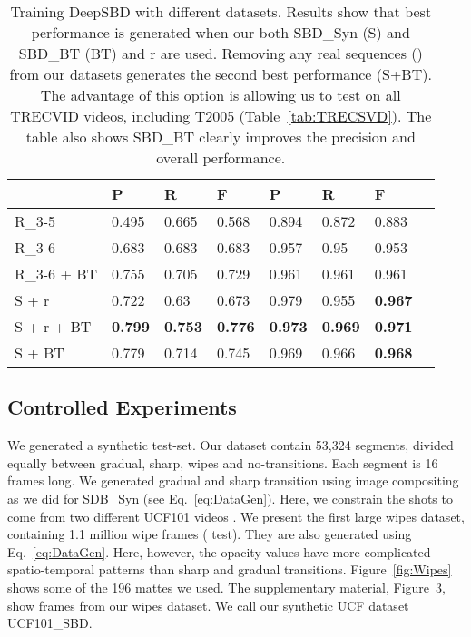 \documentclass[journal]{IEEEtran}
\begin{document}
\begin{table}
\small
\centering
\begin{tabular}{| l | l | l | l | l | l | l| l| }
     \hline              
												    &   P   & R  &  F & P    & R      & F       \\
     \hline


\hline
	      R\_3-5   		   & 0.495  & 0.665	& 0.568	& 0.894 	& 0.872	& 	0.883 \\
				\hline
				R\_3-6         & 0.683	& 0.683	& 0.683	& 0.957	& 0.95	& 0.953	 \\
				 \hline
				R\_3-6 + BT   & 0.755 & 0.705 & 0.729 & 0.961 & 0.961 & 0.961 \\
				\hline
				S + r         & 0.722 & 0.63 & 0.673 & 0.979 & 0.955 & \textbf{0.967} \\
        \hline
				S + r + BT    & \textbf{0.799} & \textbf{0.753} & \textbf{0.776} & \textbf{0.973} & \textbf{0.969} & \textbf{0.971}\\				
        \hline
			  S + BT     & 0.779 & 0.714 & 0.745 & 0.969 & 0.966 & \textbf{0.968}\\	
				\hline
    \end{tabular}\vspace{3pt}
\caption{Training DeepSBD with different datasets. Results show that best performance is generated when our both SBD\_Syn (S) and SBD\_BT (BT) and r are used. Removing any real sequences () from our datasets generates the second best performance (S+BT). The advantage of this option is allowing us to test on all TRECVID videos, including T2005 (Table~\ref{tab:TRECSVD}). The table also shows SBD\_BT clearly improves the precision and overall performance.}
\label{tab:OurDataImpact}
\end{table}

\subsection{Controlled Experiments} 

We generated a synthetic test-set. Our dataset contain 53,324 segments, divided equally between gradual, sharp, wipes and no-transitions. Each segment is 16 frames long. We generated gradual and sharp transition using image compositing as we did for SDB\_Syn (see Eq.~\ref{eq:DataGen}). Here, we constrain the shots to come from two different UCF101 videos \cite{Soomro12}. We present the first large wipes dataset, containing 1.1 million wipe frames ( test). They are also generated using Eq.~\ref{eq:DataGen}. Here, however, the opacity values  have more complicated spatio-temporal patterns than sharp and gradual transitions. Figure~\ref{fig:Wipes} shows some of the 196  mattes we used. The supplementary material, Figure~3, show frames from our wipes dataset. We call our synthetic UCF dataset UCF101\_SBD.      
\end{document}
